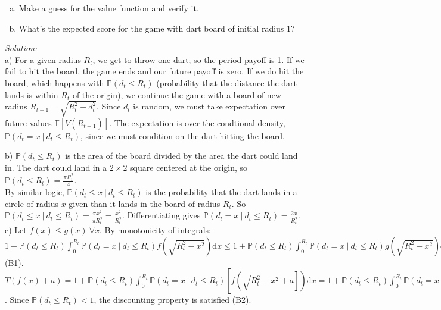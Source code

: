 \documentclass[12pt]{article}
\newif\ifsln
\newcommand{\E}{\mathbb{E}}
\renewcommand{\P}{\mathbb{P}}
\begin{document}
\begin{enumerate}[1.]
\begin{enumerate}[a)]
\item Make a guess for the value function and verify it.

\item What's the expected score for the game with dart board of initial radius 1?
\end{enumerate}

\ifsln
\textit{Solution:}\\
a) For a given radius $R_{t}$, we get to throw one dart; so the period payoff is 1. If we fail to hit the board, the game ends and our future payoff is zero. If we do hit the board, which happens with $\P(d_{t} \leq R_{t})$ (probability that the distance the dart lands is within $R_{t}$ of the origin), we continue the game with a board of new radius $R_{t+1} = \sqrt{R_{t}^{2} - d_{t}^{2}}$. Since $d_{t}$ is random, we must take expectation over future values $\E[V(R_{t+1})]$. The expectation is over the condtional density, $\P(d_{t} = x \ | \ d_{t} \leq R_{t})$, since we must condition on the dart hitting the board.\bigskip

b) $\P(d_{t} \leq R_{t})$ is the area of the board divided by the area the dart could land in. The dart could land in a $2\times 2$ square centered at the origin, so $\P(d_{t} \leq R_{t}) = \frac{\pi R_{t}^{2}}{4}$.\\

By similar logic, $\P(d_{t} \leq x \ | \ d_{t} \leq R_{t})$ is the probability that the dart lands in a circle of radius $x$ given than it lands in the board of radius $R_{t}$. So $\P(d_{t} \leq x \ | \ d_{t} \leq R_{t}) = \frac{\pi x^{2}}{\pi R_{t}^{2}} = \frac{x^{2}}{R_{t}^{2}}$. Differentiating gives $\P(d_{t} = x \ | \ d_{t} \leq R_{t}) = \frac{2 x}{ R_{t}^{2}}$.\\

c) Let $f(x) \leq g(x) \  \forall x$. By monotonicity of integrals: $1 + \P(d_{t} \leq R_{t})\int_{0}^{R_{t}} \P(d_{t}=x \ | \ d_{t} \leq R_{t}) f\left(\sqrt{R_{t}^{2} - x^{2}}  \right) \mathrm{d}x \leq 1 + \P(d_{t} \leq R_{t})\int_{0}^{R_{t}} \P(d_{t}=x \ | \ d_{t} \leq R_{t}) g\left(\sqrt{R_{t}^{2} - x^{2}}  \right) \mathrm{d}x$  (B1).\\

$T(f(x) + a) = 1 + \P(d_{t} \leq R_{t})\int_{0}^{R_{t}} \P(d_{t}=x \ | \ d_{t} \leq R_{t}) \left[ f\left(\sqrt{R_{t}^{2} - x^{2}} + a\right] \right) \mathrm{d}x = 1 + \P(d_{t} \leq R_{t})\int_{0}^{R_{t}} \P(d_{t}=x \ | \ d_{t} \leq R_{t}) f\left(\sqrt{R_{t}^{2} - x^{2}}  \right) \mathrm{d}x +  \P(d_{t} \leq R_{t})\int_{0}^{R_{t}} \P(d_{t}=x \ | \ d_{t} \leq R_{t}) a \mathrm{d}x = 1 + \P(d_{t} \leq R_{t})\int_{0}^{R_{t}} \P(d_{t}=x \ | \ d_{t} \leq R_{t}) f\left(\sqrt{R_{t}^{2} - x^{2}}  \right) \mathrm{d}x +  \P(d_{t} \leq R_{t}) a = T(f) + \P(d_{t} \leq R_{t}) a $. Since $\P(d_{t} \leq R_{t}) < 1$, the discounting property is satisfied (B2). \\


\end{enumerate}
\end{document}
